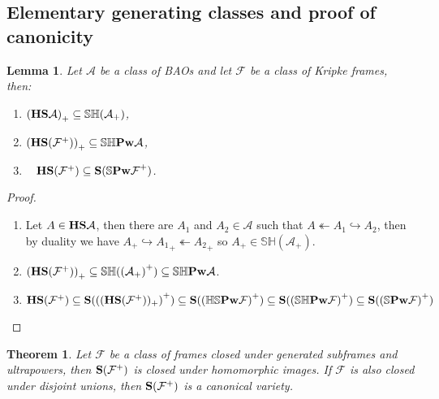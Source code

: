 \documentclass{article}
\theoremstyle{defin}
\theoremstyle{theorem}
\newtheorem{theorem}{Theorem}
\theoremstyle{claim}
\theoremstyle{prop}
\theoremstyle{lemma}
\newtheorem{lemma}{Lemma}
\theoremstyle{fact}
\theoremstyle{remark}
\theoremstyle{ex}
\theoremstyle{col}
\theoremstyle{question}
\begin{document}
\subsection{Elementary generating classes and proof of canonicity}

\begin{lemma} Let $\mathcal{A}$ be a class of BAOs and let $\mathcal{F}$ be a class of Kripke frames, then:

  \begin{enumerate}
    \item ${({\bf HS} \mathcal{A})}_+ \subseteq \mathbb{S} \mathbb{H} (\mathcal{A}_+)$,
    \item ${({\bf HS} (\mathcal{F}^+))}_+ \subseteq \mathbb{S} \mathbb{H} {\bf Pw} \mathcal{A}$,
    \item~\label{pwfact}
    ${\bf HS} (\mathcal{F}^+) \subseteq {\bf S} ({\mathbb{S} {\bf Pw} \mathcal{F}}^+)$.
  \end{enumerate}

\end{lemma}

\begin{proof}
$ $

\begin{enumerate}

  \item Let $A \in {\bf HS}\mathcal{A}$, then there are $A_1$ and $A_2 \in \mathcal{A}$ such that $A \twoheadleftarrow A_1 \hookrightarrow A_2$,
    then by duality we have $A_+ \hookrightarrow {A_1}_+ \twoheadleftarrow {A_2}_+$
    so $A_+ \in \mathbb{S} \mathbb{H} (\mathcal{A}_+)$.
  \item ${({\bf HS} (\mathcal{F}^+))}_+ \subseteq \mathbb{S} \mathbb{H} ({(\mathcal{A}_+)}^+) \subseteq \mathbb{S} \mathbb{H} {\bf Pw} \mathcal{A}$.
  \item ${\bf HS} (\mathcal{F}^+) \subseteq {\bf S} ({(({\bf H S}(\mathcal{F}^+))_+)}^+) \subseteq {\bf S}({(\mathbb{H} \mathbb{S} {\bf Pw} \mathcal{F})}^+) \subseteq {\bf S}({(\mathbb{S} \mathbb{H} {\bf Pw} \mathcal{F})}^+) \subseteq {\bf S}({(\mathbb{S} {\bf Pw} \mathcal{F})}^+)$
\end{enumerate}
\end{proof}

\begin{theorem}
  Let $\mathcal{F}$ be a class of frames closed under generated subframes and ultrapowers,
  then ${\bf S} (\mathcal{F}^+)$ is closed under homomorphic images.
  If $\mathcal{F}$ is also closed under disjoint unions, then ${\bf S} (\mathcal{F}^+)$ is a canonical variety.
\end{theorem}
\end{document}
